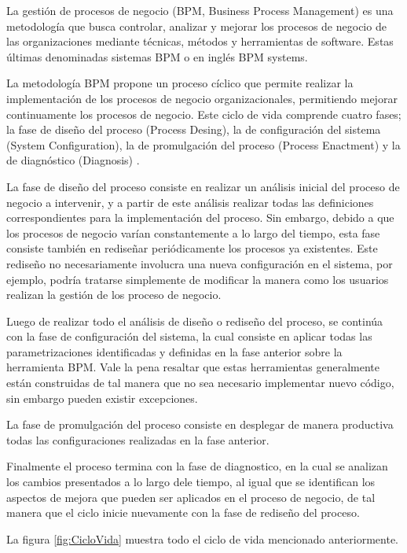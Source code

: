 La gestión de procesos de negocio (BPM, Business Process Management) es una metodología que busca controlar, analizar y mejorar los procesos de negocio de las organizaciones mediante técnicas, métodos y herramientas de software. Estas últimas denominadas sistemas BPM o en inglés BPM systems. 

La metodología BPM propone un proceso cíclico que permite realizar la implementación de los procesos de negocio organizacionales, permitiendo mejorar continuamente los procesos de negocio. Este ciclo de vida comprende cuatro fases; la fase de diseño del proceso (Process Desing), la de configuración del sistema (System Configuration), la de promulgación del proceso (Process Enactment) y la de diagnóstico (Diagnosis) \cite{VanderAalst2004}.

La fase de diseño del proceso consiste en realizar un análisis inicial del proceso de negocio a intervenir, y a partir de este análisis realizar todas las definiciones correspondientes para la implementación del proceso. Sin embargo, debido a que los procesos de negocio varían constantemente a lo largo del tiempo, esta fase consiste también en rediseñar periódicamente los procesos ya existentes. Este rediseño no necesariamente involucra una nueva configuración en el sistema, por ejemplo, podría tratarse simplemente de modificar la manera como los usuarios realizan la gestión de los proceso de negocio. 

Luego de realizar todo el análisis de diseño o rediseño del proceso, se continúa con la fase de configuración del sistema, la cual consiste en aplicar todas las parametrizaciones identificadas y definidas en la fase anterior sobre la herramienta BPM. Vale la pena resaltar que estas herramientas generalmente están construidas de tal manera que no sea necesario implementar nuevo código, sin embargo pueden existir excepciones.

La fase de promulgación del proceso consiste en desplegar de manera productiva todas las configuraciones realizadas en la fase anterior. 

Finalmente el proceso termina con la fase de diagnostico, en la cual se analizan los cambios presentados a lo largo dele tiempo, al igual que se identifican los aspectos de mejora que pueden ser aplicados en el proceso de negocio, de tal manera que el ciclo inicie nuevamente con la fase de rediseño del proceso. 

La figura \ref{fig:CicloVida} muestra todo el ciclo de vida mencionado anteriormente.

